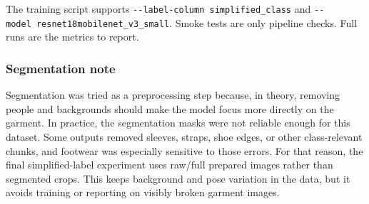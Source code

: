 \documentclass[11pt]{article}
\begin{document}
The training script supports
\texttt{-\/-label-column\ simplified\_class} and
\texttt{-\/-model\ resnet18\textbar{}mobilenet\_v3\_small}. Smoke tests
are only pipeline checks. Full runs are the metrics to report.

\subsubsection{Segmentation note}\label{segmentation-note}

Segmentation was tried as a preprocessing step because, in theory,
removing people and backgrounds should make the model focus more
directly on the garment. In practice, the segmentation masks were not
reliable enough for this dataset. Some outputs removed sleeves, straps,
shoe edges, or other class-relevant chunks, and footwear was especially
sensitive to those errors. For that reason, the final simplified-label
experiment uses raw/full prepared images rather than segmented crops.
This keeps background and pose variation in the data, but it avoids
training or reporting on visibly broken garment images.
\end{document}
